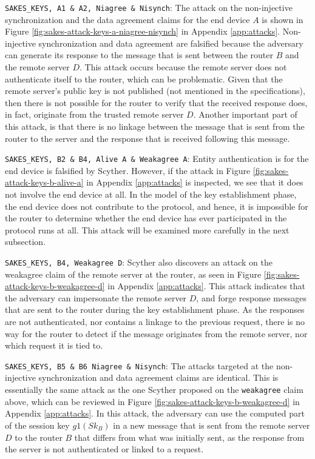 \begin{list}{•}{}


\item \texttt{SAKES\_KEYS, A1 \& A2, Niagree \& Nisynch}: The attack on the non-injective synchronization and the data agreement claims for the end device $A$ is shown in Figure \ref{fig:sakes-attack-keys-a-niagree-nisynch} in Appendix \ref{app:attacks}. Non-injective synchronization and data agreement are falsified because the adversary can generate its response to the message that is sent between the router $B$ and the remote server $D$. This attack occurs because the remote server does not authenticate itself to the router, which can be problematic. Given that the remote server's public key is not published (not mentioned in the specifications), then there is not possible for the router to verify that the received response does, in fact, originate from the trusted remote server $D$. Another important part of this attack, is that there is no linkage between the message that is sent from the router to the server and the response that is received following this message. 

\item \texttt{SAKES\_KEYS, B2 \& B4, Alive A \& Weakagree A}: Entity authentication is for the end device is falsified by Scyther. However, if the attack in Figure \ref{fig:sakes-attack-keys-b-alive-a} in Appendix \ref{app:attacks} is inspected, we see that it does not involve the end device at all. In the model of the key establishment phase, the end device does not contribute to the protocol, and hence, it is impossible for the router to determine whether the end device has ever participated in the protocol runs at all. This attack will be examined more carefully in the next subsection.

\item \texttt{SAKES\_KEYS, B4, Weakagree D}: Scyther also discovers an attack on the weakagree claim of the remote server at the router, as seen in Figure \ref{fig:sakes-attack-keys-b-weakagree-d} in Appendix \ref{app:attacks}. This attack indicates that the adversary can impersonate the remote server $D$, and forge response messages that are sent to the router during the key establishment phase. As the responses are not authenticated, nor contains a linkage to the previous request, there is no way for the router to detect if the message originates from the remote server, nor which request it is tied to.

\item \texttt{SAKES\_KEYS, B5 \& B6 Niagree \& Nisynch}: The attacks targeted at the non-injective synchronization and data agreement claims are identical.  This is essentially the same attack as the one Scyther proposed on the \texttt{weakagree} claim above, which can be reviewed in Figure \ref{fig:sakes-attack-keys-b-weakagree-d} in Appendix \ref{app:attacks}. In this attack, the adversary can use the computed part of the session key $g1(Sk_B)$ in a new message that is sent from the remote server $D$ to the router $B$ that differs from what was initially sent, as the response from the server is not authenticated or linked to a request.

\end{list}


